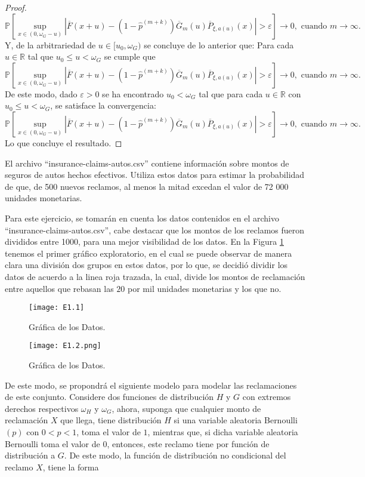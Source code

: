 \documentclass[10.5pt,notitlepage]{article}
\newcommand{\PP}{\mathbb{P}}
\newcommand{\RR}{\mathbb{R}}
\newcommand{\ee}{\varepsilon}
\newcommand{\abs}[1]{\left\lvert #1 \right\rvert}
\newcommand{\corch}[1]{\left[ #1 \right]}
\theoremstyle{plain}
\begin{document}
\begin{proof}
 \[
  \PP\corch{ \sup_{x \in (0, \omega_{G}- u)}\abs{\overline{F}(x + u) -  (1 - \hat{p}^{(m+k)})\overline{G}_{m}(u)\overline{P}_{\xi,a(u)}(x)} > \ee}\to 0, \text{ cuando } m \to \infty.
 \]
 Y, de la arbitrariedad de \(u \in[u_0, \omega_G)\) se concluye de lo anterior que: Para cada \(u \in \RR\) tal que \(u_0 \leq u < \omega_G\) se cumple que 
 \[
   \PP\corch{ \sup_{x \in (0, \omega_{G}- u)}\abs{\overline{F}(x + u) -  (1 - \hat{p}^{(m+k)})\overline{G}_{m}(u)\overline{P}_{\xi,a(u)}(x)} > \ee}\to 0, \text{ cuando } m \to \infty.
 \]
 De este modo, dado \(\ee > 0\) se ha encontrado \(u_0 <\omega_G\) tal que para cada \(u\in \RR\) con \(u_0 \leq u < \omega_G\), se satisface la convergencia:
 \[
\PP\corch{ \sup_{x \in (0, \omega_{G}- u)}\abs{\overline{F}(x + u) -  (1 - \hat{p}^{(m+k)})\overline{G}_{m}(u)\overline{P}_{\xi,a(u)}(x)} > \ee}\to 0, \text{ cuando } m \to \infty.
\]
Lo que concluye el resultado.
\end{proof}
\setcounter{exo}{0}
\begin{exo}
 El archivo ``insurance-claims-autos.csv'' contiene información sobre montos de seguros de autos hechos efectivos. Utiliza estos datos para estimar la probabilidad de que, de 500 nuevos reclamos, al menos la mitad excedan el valor de 72 000 unidades monetarias.
\end{exo}
Para este ejercicio, se tomarán en cuenta los datos contenidos en el archivo  “insurance-claims-autos.csv”, cabe destacar que los montos de los reclamos fueron divididos entre 1000, para una mejor visibilidad de los datos. En la Figura \ref{1.1} tenemos el primer gráfico exploratorio, en el cual se puede observar de manera clara una división dos grupos en estos datos, por lo que, se decidió dividir los datos de acuerdo a la linea roja trazada, la cual, divide los montos de reclamación entre aquellos que rebasan las \(20\) por mil unidades monetarias y los que no. 
\begin{figure}[h]
\centering
\texttt{[image: E1.1]}
\caption{Gráfica de los Datos.}
\label{1.1}
\end{figure}
\begin{figure}[h]
\centering
\texttt{[image: E1.2.png]}
\caption{Gráfica de los Datos.}
\label{1.2}
\end{figure}
De este modo, se propondrá el siguiente modelo para modelar las reclamaciones de este conjunto. Considere dos funciones de distribución \(H\) y \(G\) con extremos derechos respectivos $\omega_H$ y $\omega_G$, ahora, suponga que cualquier monto de reclamación \(X\) que llega, tiene distribución \(H\) si una variable aleatoria Bernoulli\((p)\) con \(0 < p <1\), toma el valor de \(1\), mientras que, si dicha variable aleatoria Bernoulli toma el valor de \(0\), entonces, este reclamo tiene por función de distribución a \(G\). De este modo, la función de distribución no condicional del reclamo \(X\), tiene la forma
\end{document}
